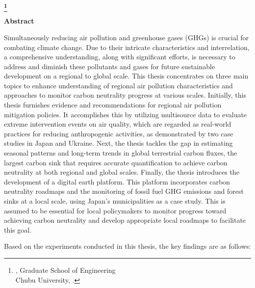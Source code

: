 \begin{center}
 \renewcommand{\thefootnote}{\fnsymbol{footnote}}
 \Large\bfseries \etitle\footnote[1]
 {{\edoctitle}, Graduate School of Engineering\\
 Chubu University, \edate.}
 \renewcommand{\thefootnote}{\arabic{footnote}}
\end{center}
\vspace*{1truemm}
\begin{center}
 \large\eauthor
\end{center}
\vspace*{10truemm}
\begin{center}
 {\bfseries Abstract}
\end{center}
\vspace*{2truemm}
\par

Simultaneously reducing air pollution and greenhouse gases (GHGs) is crucial for combating climate change. Due to their intricate characteristics and interrelation, a comprehensive understanding, along with significant efforts, is necessary to address and diminish these pollutants and gases for future sustainable development on a regional to global scale. This thesis concentrates on three main topics to enhance understanding of regional air pollution characteristics and approaches to monitor carbon neutrality progress at various scales. Initially, this thesis furnishes evidence and recommendations for regional air pollution mitigation policies. It accomplishes this by utilizing multisource data to evaluate extreme intervention events on air quality, which are regarded as real-world practices for reducing anthropogenic activities, as demonstrated by two case studies in Japan and Ukraine. Next, the thesis tackles the gap in estimating seasonal patterns and long-term trends in global terrestrial carbon fluxes, the largest carbon sink that requires accurate quantification to achieve carbon neutrality at both regional and global scales. Finally, the thesis introduces the development of a digital earth platform. This platform incorporates carbon neutrality roadmaps and the monitoring of fossil fuel GHG emissions and forest sinks at a local scale, using Japan's municipalities as a case study. This is assumed to be essential for local policymakers to monitor progress toward achieving carbon neutrality and develop appropriate local roadmaps to facilitate this goal. \par


Based on the experiments conducted in this thesis, the key findings are as follows:\par

